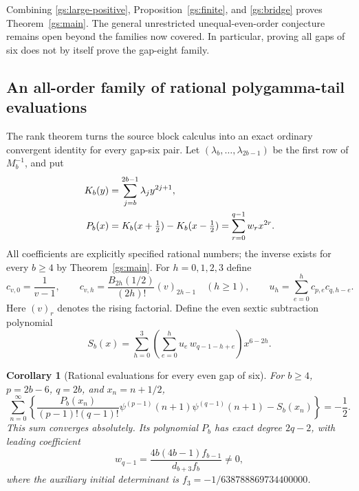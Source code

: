 \documentclass[11pt,a4paper]{article}
\newtheorem{corollary}[theorem]{Corollary}
\theoremstyle{definition}
\theoremstyle{remark}
\numberwithin{equation}{section}
\begin{document}
Combining \eqref{gs:large-positive}, Proposition~\ref{gs:finite}, and
\eqref{gs:bridge} proves Theorem~\ref{gs:main}.  The general
unrestricted unequal-even-order conjecture remains open beyond the
families now covered.  In particular, proving all gaps of six does
not by itself prove the gap-eight family.

\subsection{An all-order family of rational polygamma-tail evaluations}

The rank theorem turns the source block calculus into an exact
ordinary convergent identity for every gap-six pair.  Let
$(\lambda_b,\ldots,\lambda_{2b-1})$ be the first row of $M_b^{-1}$,
and put
\begin{align}
 K_b(y)&=\sum_{j=b}^{2b-1}\lambda_jy^{2j+1},\notag\\
 P_b(x)&=K_b(x+\tfrac12)-K_b(x-\tfrac12)
                  =\sum_{r=0}^{q-1}w_rx^{2r}.\label{gs:polynomial}
\end{align}
All coefficients are explicitly specified rational numbers; the
inverse exists for every $b\ge4$ by Theorem~\ref{gs:main}.
For $h=0,1,2,3$ define
\[
 c_{v,0}=\frac1{v-1},\qquad
 c_{v,h}=\frac{B_{2h}(1/2)}{(2h)!}(v)_{2h-1}\quad(h\ge1),
 \qquad u_h=\sum_{e=0}^hc_{p,e}c_{q,h-e}.
\]
Here $(v)_r$ denotes the rising factorial.  Define the even sextic
subtraction polynomial
\begin{equation}\label{gs:subtraction}
 S_b(x)=\sum_{h=0}^3\left(\sum_{e=0}^hu_e\,w_{q-1-h+e}\right)
                                      x^{6-2h}.
\end{equation}

\begin{corollary}[Rational evaluations for every even gap of six]
\label{gs:ordinary}
For $b\ge4$, $p=2b-6$, $q=2b$, and $x_n=n+1/2$,
\begin{equation}\label{gs:ordinary-identity}
 \boxed{\displaystyle
 \sum_{n=0}^{\infty}\left\{
 \frac{P_b(x_n)}{(p-1)!(q-1)!}
       \psi^{(p-1)}(n+1)\psi^{(q-1)}(n+1)-S_b(x_n)
                 \right\}=-\frac12.}
\end{equation}
This sum converges absolutely.  Its polynomial $P_b$ has exact degree
$2q-2$, with leading coefficient
\begin{equation}\label{gs:leading-coefficient}
 w_{q-1}=\frac{4b(4b-1)f_{b-1}}{d_{b+3}f_b}\ne0,
\end{equation}
where the auxiliary initial determinant is
$f_3=-1/638788869734400000$.
\end{corollary}
\end{document}
